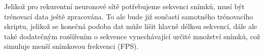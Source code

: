 Jelikož pro rekurentní neuronové sítě potřebujeme sekvenci snímků, musí být
trénovací data ještě zpracována. To ale bude již součastí samotného trénovacího
skriptu, jelikož se konečná podoba dat může lišit hlavně délkou sekvencí, dále
ale také dodatečným rozšířením o sekvence vynechávající určité množství snímků,
což simuluje menší snímkovou frekvenci (FPS).

\endinput